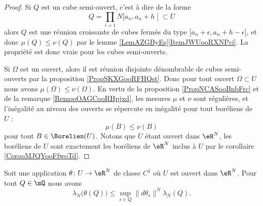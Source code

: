 \begin{proof}
    Si \( Q\) est un cube semi-ouvert, c'est à dire de la forme
    \begin{equation}
        Q=\prod_{i=1}N\mathopen[ a_n , a_n+h \mathclose[\subset U
    \end{equation}
    alors \( Q\) est une réunion croissante de cubes fermés du type \( \mathopen[ a_n+\epsilon , a_n+h-\epsilon \mathclose]\), et donc \( \mu(Q)\leq \nu(Q)\) par le lemme \ref{LemAZGByEs}\ref{ItemJWUooRXNPci}. La propriété est donc vraie pour les cubes semi-ouverts.

    Si \( \Omega\) est un ouvert, alors il est réunion disjointe dénombrable de cubes semi-ouverts par la proposition \ref{PropSKXGooRFHQst}. Donc pour tout ouvert \( \Omega\subset U\) nous avons \( \mu(\Omega)\leq\nu(\Omega)\). En vertu de la proposition \ref{PropNCASooBnbFrc} et de la remarque \ref{RemooOAGCooRHpjxd}, les mesures \( \mu\) et \( \nu\) sont régulières, et l'inégalité au niveau des ouverts se répercute en inégalité pour tout boréliens de \( U\) :
    \begin{equation}
        \mu(B)\leq \nu(B)
    \end{equation}
    pour tout \( B\in\Borelien(U)\). Notons que \( U\) étant ouvert dans \( \eR^N\), les boréliens de \( U\) sont exactement les boréliens de \( \eR^N\) inclus à \( U\) par le corollaire \ref{CorooMJQYooFfwoTd}.
\end{proof}

\begin{lemma}      \label{LemooJCEDooBRyjRg}
    Soit une application \( \theta\colon U\to \eR^N\) de classe \( C^1\) où \( U\) est ouvert dans \( \eR^N\). Pour tout \( Q\in\mQ\) nous avons
    \begin{equation}
        \lambda_N\big( \theta(Q) \big)\leq\sup_{s\in Q}\| d\theta_s \|^N\lambda_N(Q).
    \end{equation}
\end{lemma}

